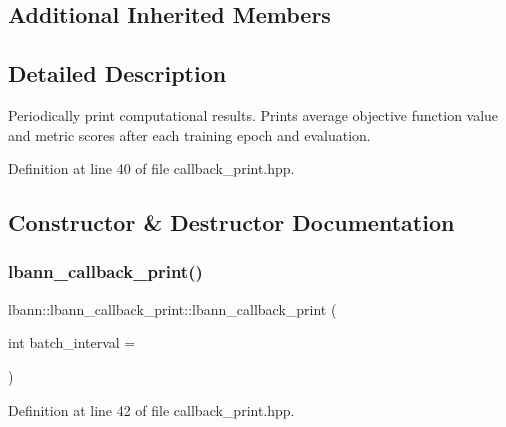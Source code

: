 \subsection*{Additional Inherited Members}


\subsection{Detailed Description}
Periodically print computational results. Prints average objective function value and metric scores after each training epoch and evaluation. 

Definition at line 40 of file callback\+\_\+print.\+hpp.



\subsection{Constructor \& Destructor Documentation}
\mbox{\label{classlbann_1_1lbann__callback__print_ac31f404ac68a2cb24cd3d544d128f1d9}} 
\subsubsection{\texorpdfstring{lbann\+\_\+callback\+\_\+print()}{lbann\_callback\_print()}\hspace{0.1cm}{\footnotesize\ttfamily [1/2]}}
{\footnotesize\ttfamily lbann\+::lbann\+\_\+callback\+\_\+print\+::lbann\+\_\+callback\+\_\+print (\begin{DoxyParamCaption}\item[{int}]{batch\+\_\+interval = {} }\end{DoxyParamCaption})\hspace{0.3cm}{\ttfamily [inline]}}



Definition at line 42 of file callback\+\_\+print.\+hpp.


